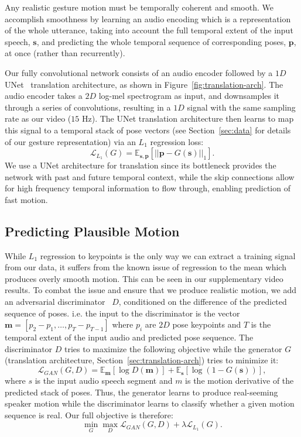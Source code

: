 \documentclass[10pt,twocolumn,letterpaper]{article}
\newcommand{\sect}[1]{Section~\ref{#1}}
\newcommand{\unet}{UNet}
\begin{document}
Any realistic gesture motion must be temporally coherent and smooth. We accomplish smoothness by learning an audio encoding which is a representation of the whole utterance, taking into account the full temporal extent of the input speech, $\mathbf{s}$, and predicting the whole temporal sequence of corresponding poses, $\mathbf{p}$, at once (rather than recurrently).

Our fully convolutional network consists of an audio encoder followed by a $1D$ \unet{}~\cite{unet,pix2pix2017} translation architecture, as shown in
Figure~\ref{fig:translation-arch}. The audio encoder takes a $2D$ log-mel spectrogram as input, and downsamples it through a series of convolutions, resulting in a $1D$ signal with the same sampling rate as our video ($15$ Hz). The \unet{} translation architecture then learns to map this signal to a temporal stack of pose vectors (see \sect{sec:data} for details of our gesture representation) via an $L_1$ regression loss:
\begin{equation}
\mathcal{L}_{L_1}(G) = \mathbb{E}_{\mathbf{s},\mathbf{p}}[||\mathbf{p}-G(\mathbf{s})||_1].
\end{equation}
We use a \unet{} architecture for translation since its bottleneck provides the network with past and future temporal context, while the skip connections allow for high frequency temporal information to flow through, enabling prediction of fast motion.


\subsection{Predicting Plausible Motion}
While $L_1$ regression to keypoints is the only way we can extract a training signal from our data, it suffers from the known issue of regression to the mean which produces overly smooth motion. This can be seen in our supplementary video results. To combat the issue and ensure that we produce realistic motion, we add an adversarial discriminator~\cite{pix2pix2017,Chan2018dance} $D$, conditioned on the difference of the predicted sequence of poses. i.e.
the input to the discriminator is the vector $\mathbf{m}=[p_2-p_1, \dots , p_T-p_{T-1}]$ where $p_i$ are $2D$ pose keypoints and $T$ is the temporal extent of the input audio and predicted pose sequence. The discriminator $D$ tries to maximize the following objective while the generator $G$ (translation architecture, Section~\ref{sec:translation-arch}) tries to minimize it:
\begin{equation}
\mathcal{L}_{GAN}(G, D) = \mathbb{E}_\mathbf{m}[\log D(\mathbf{m})]+\mathbb{E}_\mathbf{s}[\log(1-G(\mathbf{s}))],
\end{equation}
where $s$ is the input audio speech segment and $m$ is the motion derivative of the predicted stack of poses. Thus, the generator learns to produce real-seeming speaker motion while the discriminator learns to classify whether a given motion sequence is real. Our full objective is therefore:
\begin{equation}
\min_G \max_D \mathcal{L}_{GAN}(G,D) + \lambda \mathcal{L}_{L_1}(G).
\end{equation}
\end{document}
